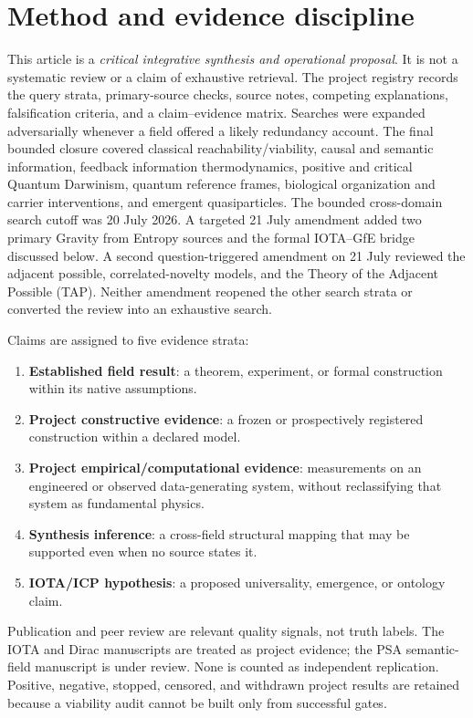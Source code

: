 \section{Method and evidence discipline}

This article is a \emph{critical integrative synthesis and operational
proposal}. It is not a systematic review or a claim of exhaustive retrieval.
The project registry records the query strata, primary-source checks, source
notes, competing explanations, falsification criteria, and a claim--evidence
matrix. Searches were expanded adversarially whenever a field offered a likely
redundancy account. The final bounded closure covered classical
reachability/viability, causal and semantic information, feedback information
thermodynamics, positive and critical Quantum Darwinism, quantum reference
frames, biological organization and carrier interventions, and emergent
quasiparticles. The bounded cross-domain search cutoff was 20 July 2026. A
targeted 21 July amendment added two primary Gravity from Entropy sources and
the formal IOTA--GfE bridge discussed below. A second question-triggered
amendment on 21 July reviewed the adjacent possible, correlated-novelty models,
and the Theory of the Adjacent Possible (TAP). Neither amendment reopened the
other search strata or converted the review into an exhaustive search.

Claims are assigned to five evidence strata:
\begin{enumerate}
  \item \textbf{Established field result}: a theorem, experiment, or formal
  construction within its native assumptions.
  \item \textbf{Project constructive evidence}: a frozen or prospectively
  registered construction within a declared model.
  \item \textbf{Project empirical/computational evidence}: measurements on an
  engineered or observed data-generating system, without reclassifying that
  system as fundamental physics.
  \item \textbf{Synthesis inference}: a cross-field structural mapping that may
  be supported even when no source states it.
  \item \textbf{IOTA/ICP hypothesis}: a proposed universality, emergence, or
  ontology claim.
\end{enumerate}

Publication and peer review are relevant quality signals, not truth labels.
The IOTA and Dirac manuscripts are treated as project evidence; the PSA
semantic-field manuscript is under review. None is counted as independent
replication. Positive, negative, stopped, censored, and withdrawn project
results are retained because a viability audit cannot be built only from
successful gates.

